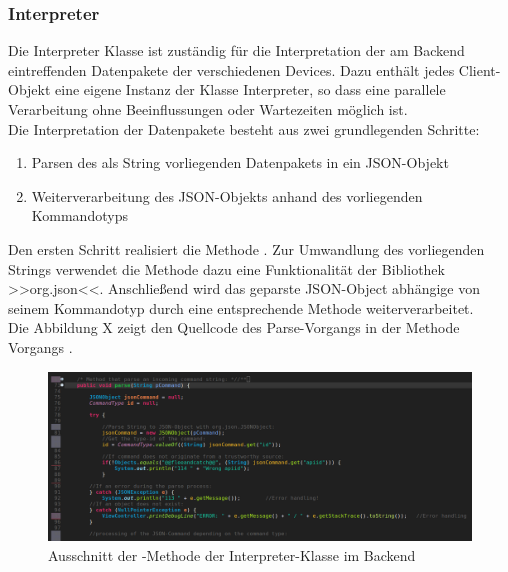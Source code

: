 \subsubsection{Interpreter}
Die Interpreter Klasse ist zuständig für die Interpretation der am Backend eintreffenden Datenpakete der verschiedenen Devices. Dazu enthält
jedes Client-Objekt eine eigene Instanz der Klasse Interpreter, so dass eine parallele Verarbeitung ohne Beeinflussungen oder Wartezeiten 
möglich ist. \\
Die Interpretation der Datenpakete besteht aus zwei grundlegenden Schritte:
\begin{enumerate}
	\item{Parsen des als String vorliegenden Datenpakets in ein JSON-Objekt}
	\item{Weiterverarbeitung des JSON-Objekts anhand des vorliegenden Kommandotyps}
\end{enumerate}
Den ersten Schritt realisiert die Methode . Zur Umwandlung des vorliegenden Strings verwendet
die Methode dazu eine Funktionalität der Bibliothek >>org.json<<. Anschließend wird das geparste JSON-Object abhängige von seinem
Kommandotyp durch eine entsprechende Methode weiterverarbeitet. \\
Die Abbildung X zeigt den Quellcode des Parse-Vorgangs in der Methode Vorgangs .
\begin{figure}[ht]
	\centering
	\includegraphics[width=1.0\textwidth]{images/implementation/InterpreterParseMethod.png}
	\caption[Ausschnitt der -Methode der Interpreter-Klasse im Backend]{Ausschnitt der -Methode der Interpreter-Klasse im Backend}
	\label{fig:ev3system}
\end{figure}
